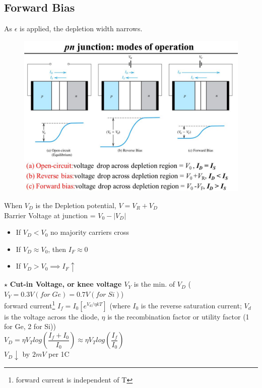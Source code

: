 \documentclass[10pt, a4paper]{report}
\begin{document}
	\subsection{Forward Bias}
	As $\epsilon$ is applied, the depletion width narrows.
	\begin{figure}[h!]
		\centering
		\includegraphics[width=0.7\linewidth]{img/potential-across-diode}
		\caption{}
		\label{fig:potential-across-diode}
	\end{figure}
	When $ V_D $ is the Depletion potential, $ V = V_R + V_D $\\Barrier Voltage at junction = $ V_0 - |V_D| $
	\begin{itemize}
		\item If $ V_D < V_0 $ no majority carriers cross
		\item If $ V_D \approx V_0 $, then  $ I_F \approx 0 $
		\item If $ V_D > V_0 \implies I_F  \uparrow$ 
	\end{itemize}
	$\star$ \textbf{Cut-in Voltage, or knee voltage $ V_Y $} is the min. of $ V_D $ ($ V_Y = 0.3V(for \; Ge) =0.7V(for \; Si) $) \\
	forward current\footnote{forward current is independent of T} $ I_f = I_0[ e^{V_d/\eta k T}] $ (where $ I_0 $ is the reverse saturation current; $ V_d $ is the voltage across the diode, $\eta$ is the recombination factor or utility factor (1 for Ge, 2 for Si)) \\
	$ V_D = \eta V_T log(\dfrac{I_f+I_0}{I_0}) \approx \eta V_T log(\dfrac{I_f}{I_0}) $ \\
	$ V_D \downarrow $ by $ 2 mV $ per 1C
	
\end{document}
